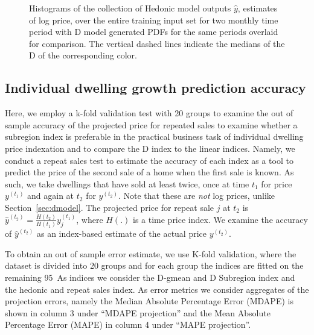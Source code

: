 \begin{figure}[H]
	\begin{center}
	\end{center}
	\caption{  Histograms of the collection of Hedonic model outputs $\hat{y}$, estimates of log price, over the entire training input set for two monthly time period with D model generated PDFs for the same periods overlaid for comparison. The vertical dashed lines indicate the medians of the D of the corresponding color.}
	\label{hist_hedonic}
\end{figure}

\subsection{Individual dwelling growth prediction accuracy }
\label{growth_accuracy}

 Here, we employ a k-fold validation test with 20 groups to examine the out of sample accuracy of the projected price for repeated sales to examine whether a subregion index is preferable in the practical business task of individual dwelling price indexation and to compare the D index to the linear indices. Namely, we conduct a repeat sales test to estimate the accuracy of each index as a tool to predict the price of the second sale of a home when the first sale is known. As such, we take dwellings that have sold at least twice, once at time $t_1$ for price $y^{(t_1)}$ and again at $t_2$ for $y^{(t_2)}$. Note that these are \emph{not} log prices, unlike Section~\ref{sec:dmodel}. 
  The projected price for repeat sale $j$ at $t_2$ is $ \hat{y}^{(t_2)} = \frac{H(t_2)}{H(t_1)} y^{(t_1)}_j$, where $H(.)$ is a time price index. We examine the accuracy of $ \hat{y}^{(t_2)} $ as an index-based estimate of the actual price $y^{(t_2)}$. 
  
  To obtain an out of sample error estimate, we use K-fold validation, where the dataset is divided into 20 groups and for each group the indices are fitted on the remaining 95\  As indices we consider the D-gmean and D Subregion index and the hedonic and repeat sales index. 
  As error metrics we consider aggregates of the projection errors, namely the Median Absolute Percentage Error (MDAPE) is shown in column 3 under ``MDAPE projection'' and the Mean Absolute Percentage Error (MAPE) in column 4 under ``MAPE projection''. 

